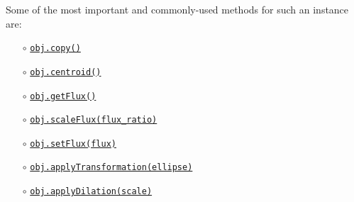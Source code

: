 \documentclass[preprint,11pt]{aastex}
\begin{document}
Some of the most important and commonly-used methods for such an
instance are:
\begin{itemize}
\item[$\circ$]
  \href{http://galsim-developers.github.com/GalSim/classgalsim_1_1base_1_1_g_s_object.html#aa0b398d4b0fca70211e4a73f81ea7e1a}{\texttt{obj.copy()}}
\item[$\circ$]
  \href{http://galsim-developers.github.com/GalSim/classgalsim_1_1base_1_1_g_s_object.html#a662d8ce421ecd90080bdcaaf6890aed8}{\texttt{obj.centroid()}}
\item[$\circ$]
  \href{http://galsim-developers.github.com/GalSim/classgalsim_1_1base_1_1_g_s_object.html#a662d8ce421ecd90080bdcaaf6890aed8}{\texttt{obj.getFlux()}}
\item[$\circ$]\href{http://galsim-developers.github.com/GalSim/classgalsim_1_1base_1_1_g_s_object.html#af4193645a9af52e7d54a044cafec8ab9}{\texttt{obj.scaleFlux(flux\_ratio)}}
\item[$\circ$]
  \href{http://galsim-developers.github.com/GalSim/classgalsim_1_1base_1_1_g_s_object.html#a1993652591ddc802b734186391b28894}{\texttt{obj.setFlux(flux)}}
\item[$\circ$]
\href{http://galsim-developers.github.com/GalSim/classgalsim_1_1base_1_1_g_s_object.html#ad491a1276fda07b148c6466d5dbd07b1}{\texttt{obj.applyTransformation(ellipse)}}
\item[$\circ$]
  \href{http://galsim-developers.github.com/GalSim/classgalsim_1_1base_1_1_g_s_object.html#a4301c73bbc1491ebb170e64c509cadd5}{\texttt{obj.applyDilation(scale)}}

\end{itemize}
\end{document}
